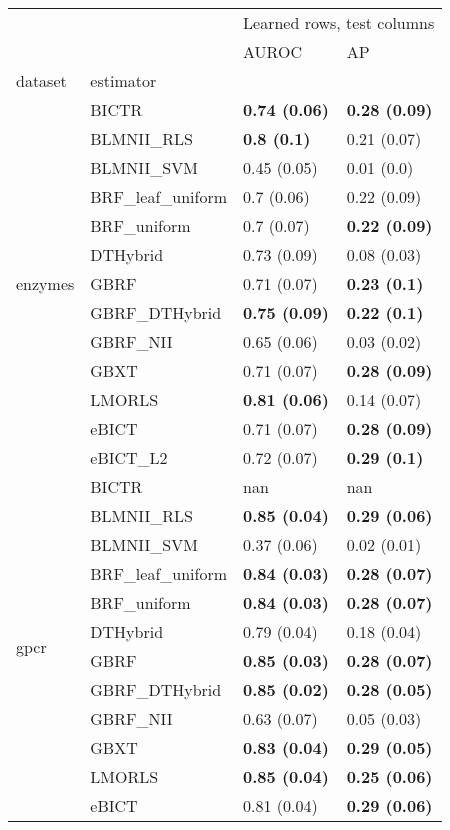 \begin{tabular}{llll}
\toprule
 &  & \multicolumn{2}{r}{Learned rows, test columns} \\
 &  & AUROC & AP \\
dataset & estimator &  &  \\
\midrule
\multirow[c]{13}{*}{enzymes} & BICTR & \textbf{0.74 (0.06)} & \textbf{0.28 (0.09)} \\
 & BLMNII\_RLS & \textbf{0.8 (0.1)} & 0.21 (0.07) \\
 & BLMNII\_SVM & 0.45 (0.05) & 0.01 (0.0) \\
 & BRF\_leaf\_uniform & 0.7 (0.06) & 0.22 (0.09) \\
 & BRF\_uniform & 0.7 (0.07) & \textbf{0.22 (0.09)} \\
 & DTHybrid & 0.73 (0.09) & 0.08 (0.03) \\
 & GBRF & 0.71 (0.07) & \textbf{0.23 (0.1)} \\
 & GBRF\_DTHybrid & \textbf{0.75 (0.09)} & \textbf{0.22 (0.1)} \\
 & GBRF\_NII & 0.65 (0.06) & 0.03 (0.02) \\
 & GBXT & 0.71 (0.07) & \textbf{0.28 (0.09)} \\
 & LMORLS & \textbf{0.81 (0.06)} & 0.14 (0.07) \\
 & eBICT & 0.71 (0.07) & \textbf{0.28 (0.09)} \\
 & eBICT\_L2 & 0.72 (0.07) & \textbf{0.29 (0.1)} \\
\cline{1-2}
\multirow[c]{13}{*}{gpcr} & BICTR & nan & nan \\
 & BLMNII\_RLS & \textbf{0.85 (0.04)} & \textbf{0.29 (0.06)} \\
 & BLMNII\_SVM & 0.37 (0.06) & 0.02 (0.01) \\
 & BRF\_leaf\_uniform & \textbf{0.84 (0.03)} & \textbf{0.28 (0.07)} \\
 & BRF\_uniform & \textbf{0.84 (0.03)} & \textbf{0.28 (0.07)} \\
 & DTHybrid & 0.79 (0.04) & 0.18 (0.04) \\
 & GBRF & \textbf{0.85 (0.03)} & \textbf{0.28 (0.07)} \\
 & GBRF\_DTHybrid & \textbf{0.85 (0.02)} & \textbf{0.28 (0.05)} \\
 & GBRF\_NII & 0.63 (0.07) & 0.05 (0.03) \\
 & GBXT & \textbf{0.83 (0.04)} & \textbf{0.29 (0.05)} \\
 & LMORLS & \textbf{0.85 (0.04)} & \textbf{0.25 (0.06)} \\
 & eBICT & 0.81 (0.04) & \textbf{0.29 (0.06)} \\

\end{tabular}
